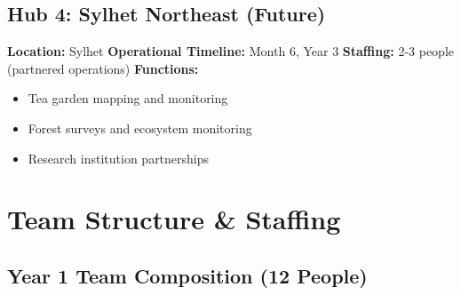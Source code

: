 \subsection{Hub 4: Sylhet Northeast (Future)}

\textbf{Location:} Sylhet
\textbf{Operational Timeline:} Month 6, Year 3
\textbf{Staffing:} 2-3 people (partnered operations)
\textbf{Functions:}
\begin{itemize}
    \item Tea garden mapping and monitoring
    \item Forest surveys and ecosystem monitoring
    \item Research institution partnerships
\end{itemize}

\section{Team Structure \& Staffing}

\subsection{Year 1 Team Composition (12 People)}

